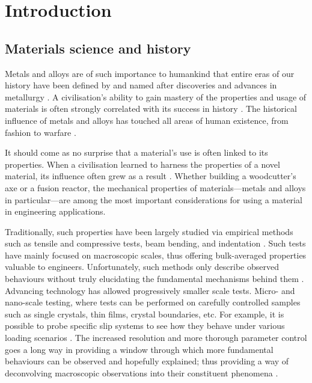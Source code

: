 \chapter{Introduction}
\label{c:intro}

\section{Materials science and history}
\label{s:matsci_history}

Metals and alloys are of such importance to humankind that entire eras of our history have been defined by and named after discoveries and advances in metallurgy \cite{metals_prehistory1, metals_prehistory2}. A civilisation's ability to gain mastery of the properties and usage of materials is often strongly correlated with its success in history \cite{metals_success1}. The historical influence of metals and alloys has touched all areas of human existence, from fashion to warfare \cite{metals_social}.

It should come as no surprise that a material's use is often linked to its properties. When a civilisation learned to harness the properties of a novel material, its influence often grew as a result \cite{metals_success1,metals_success2}. Whether building a woodcutter's axe or a fusion reactor, the mechanical properties of materials---metals and alloys in particular---are among the most important considerations for using a material in engineering applications.

Traditionally, such properties have been largely studied via empirical methods such as tensile and compressive tests, beam bending, and indentation \cite{tensile_test_theory, bending_test_theory, indentation_theory}. Such tests have mainly focused on macroscopic scales, thus offering bulk-averaged properties valuable to engineers. Unfortunately, such methods only describe observed behaviours without truly elucidating the fundamental mechanisms behind them \cite{micromech_test1}. Advancing technology has allowed progressively smaller scale tests. Micro- and nano-scale testing, where tests can be performed on carefully controlled samples such as single crystals, thin films, crystal boundaries, etc. For example, it is possible to probe specific slip systems to see how they behave under various loading scenarios \cite{micromech_test2, micro_macro2}. The increased resolution and more thorough parameter control goes a long way in providing a window through which more fundamental behaviours can be observed and hopefully explained; thus providing a way of deconvolving macroscopic observations into their constituent phenomena \cite{micro_macro1, micro_macro2}.

